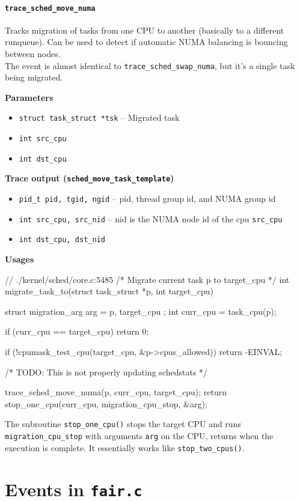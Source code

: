 \paragraph{\texttt{trace\_sched\_move\_numa}}
Tracks migration of tasks from one CPU to another (basically to a different runqueue). Can be used to detect if automatic NUMA balancing is bouncing between nodes.\\The event is almost identical to \texttt{trace\_sched\_swap\_numa}, but it's a single task being migrated.

\textbf{Parameters}
\begin{itemize}
    \item \verb|struct task_struct *tsk| -- Migrated task
    \item \verb|int src_cpu|
    \item \verb|int dst_cpu|
\end{itemize}

\textbf{Trace output (\texttt{sched\_move\_task\_template})}
\begin{itemize}
    \item \verb|pid_t pid, tgid, ngid| -- pid, thread group id, and NUMA group id
    \item \verb|int src_cpu, src_nid| -- nid is the NUMA node id of the cpu \verb|src_cpu|
    \item \verb|int dst_cpu, dst_nid|
\end{itemize}

\textbf{Usages}
\begin{code}
// ./kernel/sched/core.c:5485
/* Migrate current task p to target_cpu */
int migrate_task_to(struct task_struct *p, int target_cpu) {
	struct migration_arg arg = { p, target_cpu };
	int curr_cpu = task_cpu(p);

	if (curr_cpu == target_cpu)
		return 0;

	if (!cpumask_test_cpu(target_cpu, &p->cpus_allowed))
		return -EINVAL;

	/* TODO: This is not properly updating schedstats */

	trace_sched_move_numa(p, curr_cpu, target_cpu);
	return stop_one_cpu(curr_cpu, migration_cpu_stop, &arg);
}
\end{code}
The subroutine \verb|stop_one_cpu()| stops the target CPU and runs \verb|migration_cpu_stop| with arguments \verb|arg| on the CPU, returns when the execution is complete. It essentially works like \verb|stop_two_cpus()|.

\section{Events in \texttt{fair.c}}
